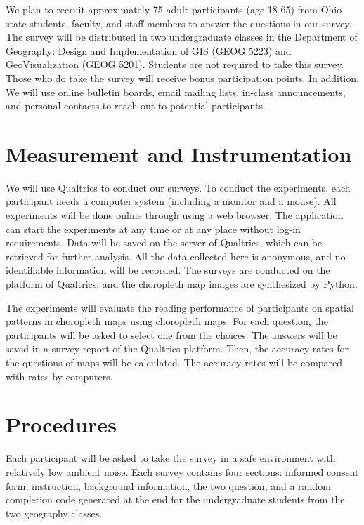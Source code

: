 We plan to recruit approximately 75 adult participants (age 18-65) from Ohio state students, faculty, and staff members to answer the questions in our survey. The survey will be distributed in two undergraduate classes in the Department of Geography: Design and Implementation of GIS (GEOG 5223) and GeoVisualization (GEOG 5201). Students are not required to take this survey. Those who do take the survey will receive bonus participation points. In addition, We will use online bulletin boards, email mailing lists, in-class announcements, and personal contacts to reach out to potential participants. 

\section{Measurement and Instrumentation}

We will use Qualtrics to conduct our surveys. To conduct the experiments, each participant needs a computer system (including a monitor and a mouse). All experiments will be done online through using a web browser. The application can start the experiments at any time or at any place without log-in requirements. Data will be saved on the server of Qualtrics, which can be retrieved for further analysis. All the data collected here is anonymous, and no identifiable information will be recorded. The surveys are conducted on the platform of Qualtrics, and the choropleth map images are synthesized by Python. 

The experiments will evaluate the reading performance of participants on spatial patterns in choropleth maps using choropleth maps. For each question, the participants will be asked to select one from the choices. The answers will be saved in a survey report of the Qualtrics platform. Then, the accuracy rates for the questions of maps will be calculated. The accuracy rates will be compared with rates by computers.

\section{Procedures}

Each participant will be asked to take the survey in a safe environment with relatively low ambient noise. Each survey contains four sections: informed consent form, instruction, background information, the two question, and a random completion code generated at the end for the undergraduate students from the two geography classes.

